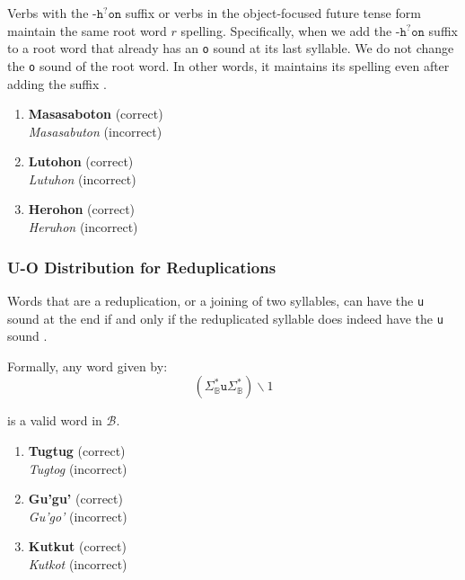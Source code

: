 Verbs with the $\texttt{-h}^?\texttt{on}$ suffix or verbs in the object-focused future tense form maintain the same root word $r$ spelling. Specifically, when we add the $\texttt{-h}^?\texttt{on}$ suffix to a root word that already has an \texttt{o} sound at its last syllable. We do not change the \texttt{o} sound of the root word. In other words, it maintains its spelling even after adding the suffix \cite{bikol_dictionary}.

\begin{example}
\end{example}

\begin{enumerate}
      \item \textbf{Masasaboton} (correct) \\
            \textit{Masasabuton} (incorrect)
      \item \textbf{Lutohon} (correct) \\
            \textit{Lutuhon} (incorrect)
      \item \textbf{Herohon} (correct) \\
            \textit{Heruhon} (incorrect)
\end{enumerate}

\subsubsection{U-O Distribution for Reduplications}

Words that are a reduplication, or a joining of two syllables, can have the \texttt{u} sound at the end if and only if the reduplicated syllable does indeed have the \texttt{u} sound \cite{bikol_dictionary}.

Formally, any word given by:
\[
      \left( \Sigma_\mathbb{B}^*\texttt{u}\Sigma_\mathbb{B}^* \right)\backslash1
\]

is a valid word in $\mathcal{B}$.

\begin{example}

\end{example}

\begin{enumerate}
      \item \textbf{Tugtug} (correct) \\
            \textit{Tugtog} (incorrect)
      \item \textbf{Gu'gu'} (correct)
            \\ \textit{Gu'go'} (incorrect)
      \item \textbf{Kutkut} (correct)
            \\ \textit{Kutkot} (incorrect)
\end{enumerate}


